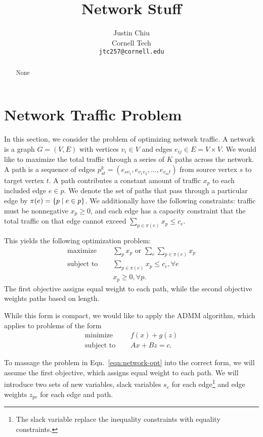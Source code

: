 \documentclass[11pt]{article}
\title{Network Stuff}
\author{Justin Chiu \\
  Cornell Tech \\
  \texttt{jtc257@cornell.edu}}
\begin{document}
\maketitle
\begin{abstract}
None
\end{abstract}

\section{Network Traffic Problem}
In this section, we consider the problem of optimizing network traffic.
A network is a graph $G = (V,E)$ with vertices $v_i\in V$ and edges
$e_{ij}\in E = V\times V$.
We would like to maximize the total traffic through a series of $K$ paths across the network.
A path is a sequence of edges $p_{st}^k = (e_{sv_1},e_{v_1v_2},\ldots,e_{v_mt})$
from source vertex $s$ to target vertex $t$.
A path contributes a constant amount of traffic $x_p$ to each included edge $e\in p$.
We denote the set of paths that pass through a particular edge by
$\pi(e) = \left\{p \mid e \in p\right\}$.
We additionally have the following constraints: traffic must be nonnegative $x_p \geq 0$,
and each edge has a capacity constraint that the total traffic on that
edge cannot exceed $\sum_{p\in\pi(e)} x_p \le c_e$.

This yields the following optimization problem:
\begin{equation}
\label{eqn:network-opt}
\begin{aligned}
\textrm{maximize } \quad & \sum_{p} x_p \textrm{ or } \sum_{e} \sum_{p\in\pi(e)}x_{p}\\
\textrm{subject to } \quad &\sum_{p\in\pi(e)}x_p \le c_e, \forall e\\
& x_p \geq 0, \forall p.
\end{aligned}
\end{equation}
The first objective assigns equal weight to each path, while the second
objective weights paths based on length.

While this form is compact, we would like to apply the ADMM algorithm,
which applies to problems of the form
\begin{equation}
\label{eqn:admm}
\begin{aligned}
\textrm{minimize } \quad & f(x) + g(z)\\
\textrm{subject to } \quad & Ax + Bz = c.
\end{aligned}
\end{equation}

To massage the problem in Eqn.~\ref{eqn:network-opt} into the correct form,
we will assume the first objective, which assigns equal weight to each path.
We will introduce two sets of new variables, slack variables $s_e$ for each edge\footnote{
The slack variable replace the inequality constraints with equality constraints.
}
and edge weights $z_{pe}$ for each edge and path.
\end{document}
